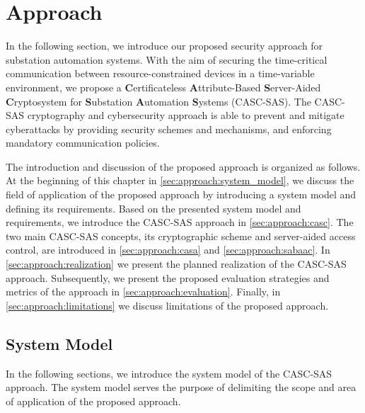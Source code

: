 \chapter{Approach}
\label{ch:approach}
In the following section, we introduce our proposed security approach for substation automation systems.
With the aim of securing the time-critical communication between resource-constrained devices in a time-variable environment, we propose a \textbf{C}ertificateless \textbf{A}ttribute-Based \textbf{S}erver-Aided \textbf{C}ryptosystem for \textbf{S}ubstation \textbf{A}utomation \textbf{S}ystems (CASC-SAS).
The CASC-SAS cryptography and cybersecurity approach is able to prevent and mitigate cyberattacks by providing security schemes and mechanisms, and enforcing mandatory communication policies.

The introduction and discussion of the proposed approach is organized as follows.
At the beginning of this chapter in \autoref{sec:approach:system_model}, we discuss the field of application of the proposed approach by introducing a system model and defining its requirements.
Based on the presented system model and requirements, we introduce the CASC-SAS approach in \autoref{sec:approach:casc}.
The two main CASC-SAS concepts, its cryptographic scheme and server-aided access control, are introduced in \autoref{sec:approach:casa} and \autoref{sec:approach:sabaac}.
In \autoref{sec:approach:realization} we present the planned realization of the CASC-SAS approach.
Subsequently, we present the proposed evaluation strategies and metrics of the approach in \autoref{sec:approach:evaluation}.
Finally, in \autoref{sec:approach:limitations} we discuss limitations of the proposed approach.

\section{System Model}
\label{sec:approach:system_model}
In the following sections, we introduce the system model of the CASC-SAS approach.
The system model serves the purpose of delimiting the scope and area of application of the proposed approach.

